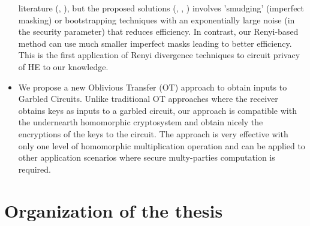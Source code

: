 \begin{itemize}
  literature (\cite{sander1999non}, \cite{ishai2007evaluating}), but the
  proposed solutions (\cite{homenc}, \cite{ostrovsky2014maliciously},
  \cite{gentry2010hop}) involves 'smudging' (imperfect masking) or bootstrapping
  techniques with an exponentially large noise (in the security parameter) that
  reduces efficiency. In contrast, our Renyi-based method can use much smaller
  imperfect masks leading to better efficiency. This is the first application of
  Renyi divergence techniques to circuit privacy of HE to our knowledge.
\item We propose a new Oblivious Transfer (OT) approach to obtain inputs to
  Garbled Circuits. Unlike traditional OT approaches where the receiver obtains
  keys as inputs to a garbled circuit, our approach is compatible with the
  undernearth homomorphic cryptosystem and obtain nicely the encryptions of the
  keys to the circuit. The approach is very effective with only one level of
  homomorphic multiplication operation and can be applied to other application
  scenarios where secure multy-parties computation is required.
\end{itemize}

\section{Organization of the thesis}
\label{sec:introOrganize}

